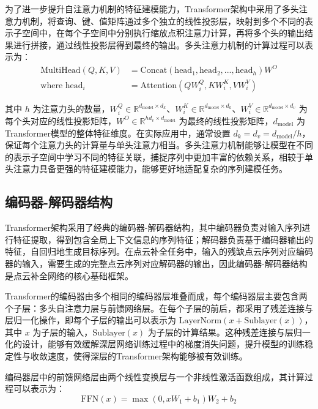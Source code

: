 为了进一步提升自注意力机制的特征建模能力，Transformer架构中采用了多头注意力机制，将查询、键、值矩阵通过多个独立的线性投影层，映射到多个不同的表示子空间中，在每个子空间中分别执行缩放点积注意力计算，再将多个头的输出结果进行拼接，通过线性投影层得到最终的输出。多头注意力机制的计算过程可以表示为：
\begin{equation}
\begin{split}
\text{MultiHead}(Q, K, V) &= \text{Concat}(\text{head}_1, \text{head}_2, ..., \text{head}_h) W^O \\
\text{where head}_i &= \text{Attention}(Q W_i^Q, K W_i^K, V W_i^V)
\end{split}
\end{equation}

其中 $h$ 为注意力头的数量，$W_i^Q \in \mathbb{R}^{d_{\text{model}} \times d_k}$、$W_i^K \in \mathbb{R}^{d_{\text{model}} \times d_k}$、$W_i^V \in \mathbb{R}^{d_{\text{model}} \times d_v}$ 为每个头对应的线性投影矩阵，$W^O \in \mathbb{R}^{h d_v \times d_{\text{model}}}$ 为最终的线性投影矩阵，$d_{\text{model}}$ 为Transformer模型的整体特征维度。在实际应用中，通常设置 $d_k = d_v = d_{\text{model}} / h$，保证每个注意力头的计算量与单头注意力相当。多头注意力机制能够让模型在不同的表示子空间中学习不同的特征关联，捕捉序列中更加丰富的依赖关系，相较于单头注意力具备更强的特征建模能力，能够更好地适配复杂的序列建模任务。

\subsection{编码器-解码器结构}
Transformer架构采用了经典的编码器-解码器结构，其中编码器负责对输入序列进行特征提取，得到包含全局上下文信息的序列特征；解码器负责基于编码器输出的特征，自回归地生成目标序列。在点云补全任务中，输入的残缺点云序列对应编码器的输入，需要生成的完整点云序列对应解码器的输出，因此编码器-解码器结构是点云补全网络的核心基础框架。

Transformer的编码器由多个相同的编码器层堆叠而成，每个编码器层主要包含两个子层：多头自注意力层与前馈网络层。在每个子层的前后，都采用了残差连接与层归一化操作，即每个子层的输出可以表示为 $\text{LayerNorm}(x + \text{Sublayer}(x))$，其中 $x$ 为子层的输入，$\text{Sublayer}(x)$ 为子层的计算结果。这种残差连接与层归一化的设计，能够有效缓解深层网络训练过程中的梯度消失问题，提升模型的训练稳定性与收敛速度，使得深层的Transformer架构能够被有效训练。

编码器层中的前馈网络层由两个线性变换层与一个非线性激活函数组成，其计算过程可以表示为：
\begin{equation}
\text{FFN}(x) = \max(0, x W_1 + b_1) W_2 + b_2
\end{equation}

